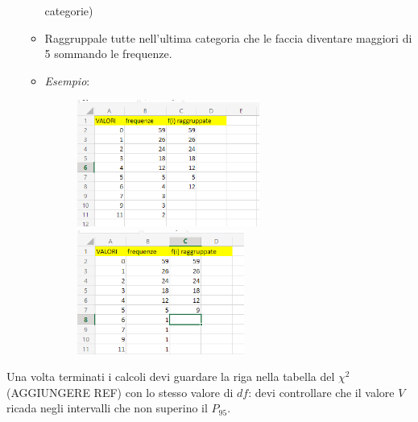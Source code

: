 \begin{enumerate}
\begin{itemize}
                        categorie)
                  \item Raggruppale tutte nell'ultima categoria che le faccia
                        diventare maggiori di 5 sommando le frequenze.
                  \item \textit{Esempio}:
                        \begin{figure}[H]
                              \centering
                              \includegraphics[width=6cm, keepaspectratio]{capitoli/goodnes_of_fit/imgs/vesceragay.png}
                              \includegraphics[width=5.5cm, keepaspectratio]{capitoli/goodnes_of_fit/imgs/POSTAMOLTOGAY.png}
                        \end{figure}
            \end{itemize}
\end{enumerate}

Una volta terminati i calcoli devi guardare la riga nella tabella del $\chi^2$
(AGGIUNGERE REF) con lo stesso valore di $df$: devi controllare che il valore
$V$ ricada negli intervalli che non superino il $P_{95}$.